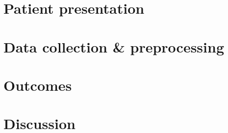 \section{Patient presentation}
\section{Data collection \& preprocessing}
\section{Outcomes}
\section{Discussion}
